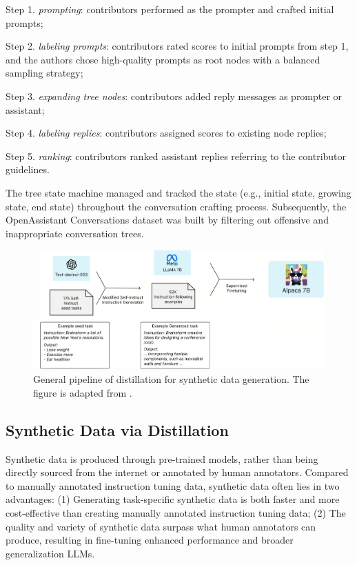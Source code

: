 \documentclass[11pt]{article}
\begin{document}
\noindent Step 1. \textit{prompting}: contributors performed as the prompter and crafted initial prompts; 

\noindent Step 2. \textit{labeling prompts}: contributors rated scores to initial prompts from step 1, and the authors chose high-quality prompts as root nodes with a balanced sampling strategy; 

\noindent Step 3. \textit{expanding tree nodes}: contributors added reply messages as prompter or assistant;

\noindent Step 4. \textit{labeling replies}: contributors assigned scores to existing node replies; 

\noindent Step 5. \textit{ranking}: contributors ranked assistant replies referring to the contributor guidelines. 


The tree state machine managed and tracked the state (e.g., initial state, growing state, end state) throughout the conversation crafting process. Subsequently, the OpenAssistant Conversations dataset was built by filtering out offensive and inappropriate conversation trees.

\begin{figure}
    \centering
    \includegraphics[width=0.95\linewidth]{figures/distilation_apaca_process.png}   
    \caption{General pipeline of distillation for synthetic data generation. The figure is adapted from \citet{taori2023alpaca}.}
    \label{fig:distilation_apaca_process}
\end{figure}

\subsection{Synthetic Data via Distillation}

Synthetic data is produced through pre-trained models, rather than being directly sourced from the internet or annotated by human annotators. Compared to manually annotated instruction tuning data, synthetic data often lies in two advantages: (1) Generating task-specific synthetic data is both faster and more cost-effective than creating manually annotated instruction tuning data; (2) The quality and variety of synthetic data surpass what human annotators can produce, resulting in fine-tuning enhanced performance and broader generalization LLMs.
\end{document}
